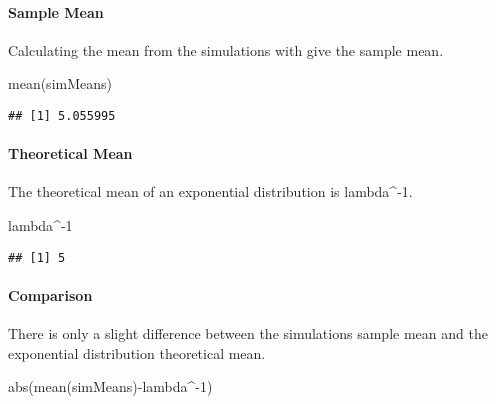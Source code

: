 \documentclass[
]{article}
\newenvironment{Shaded}{\begin{snugshade}}{\end{snugshade}}
\newcommand{\DecValTok}[1]{\textcolor[rgb]{0.00,0.00,0.81}{#1}}
\newcommand{\FunctionTok}[1]{\textcolor[rgb]{0.00,0.00,0.00}{#1}}
\newcommand{\NormalTok}[1]{#1}
\newcommand{\SpecialCharTok}[1]{\textcolor[rgb]{0.00,0.00,0.00}{#1}}
\begin{document}
\hypertarget{sample-mean}{%
\paragraph{Sample Mean}\label{sample-mean}}

Calculating the mean from the simulations with give the sample mean.

\begin{Shaded}
\begin{Highlighting}[]
\FunctionTok{mean}\NormalTok{(simMeans)}
\end{Highlighting}
\end{Shaded}

\begin{verbatim}
## [1] 5.055995
\end{verbatim}

\hypertarget{theoretical-mean}{%
\paragraph{Theoretical Mean}\label{theoretical-mean}}

The theoretical mean of an exponential distribution is lambda\^{}-1.

\begin{Shaded}
\begin{Highlighting}[]
\NormalTok{lambda}\SpecialCharTok{\^{}{-}}\DecValTok{1}
\end{Highlighting}
\end{Shaded}

\begin{verbatim}
## [1] 5
\end{verbatim}

\hypertarget{comparison}{%
\paragraph{Comparison}\label{comparison}}

There is only a slight difference between the simulations sample mean
and the exponential distribution theoretical mean.

\begin{Shaded}
\begin{Highlighting}[]
\FunctionTok{abs}\NormalTok{(}\FunctionTok{mean}\NormalTok{(simMeans)}\SpecialCharTok{{-}}\NormalTok{lambda}\SpecialCharTok{\^{}{-}}\DecValTok{1}\NormalTok{)}
\end{Highlighting}
\end{Shaded}
\end{document}
